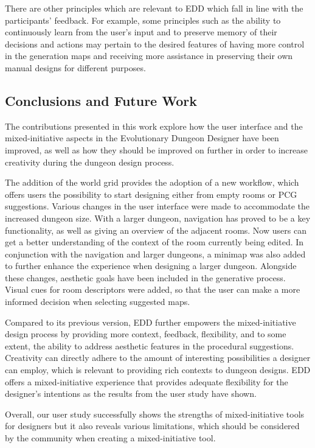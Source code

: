 There are other principles which are relevant to EDD which fall in line with the participants’ feedback. For example, some principles such as the ability to continuously learn from the user’s input and to preserve memory of their decisions and actions may pertain to the desired features of having more control in the generation maps and receiving more assistance in preserving their own manual designs for different purposes.

\subsection{Conclusions and Future Work}

The contributions presented in this work explore how the user interface and the mixed-initiative aspects in the Evolutionary Dungeon Designer have been improved, as well as how they should be improved on further in order to increase creativity during the dungeon design process.

The addition of the world grid provides the adoption of a new workflow, which offers users the possibility to start designing either from empty rooms or PCG suggestions. Various changes in the user interface were made to accommodate the increased dungeon size. With a larger dungeon, navigation has proved to be a key functionality, as well as giving an overview of the adjacent rooms. Now users can get a better understanding of the context of the room currently being edited. In conjunction with the navigation and larger dungeons, a minimap was also added to further enhance the experience when designing a larger dungeon. Alongside these changes, aesthetic goals have been included in the generative process. Visual cues for room descriptors were added, so that the user can make a more informed decision when selecting suggested maps.

Compared to its previous version, EDD further empowers the mixed-initiative design process by providing more context, feedback, flexibility, and to some extent, the ability to address aesthetic features in the procedural suggestions. Creativity can directly adhere to the amount of interesting possibilities a designer can employ, which is relevant to providing rich contexts to dungeon designs. EDD offers a mixed-initiative experience that provides adequate flexibility for the designer’s intentions as the results from the user study have shown.

Overall, our user study successfully shows the strengths of mixed-initiative tools for designers but it also reveals various limitations, which should be considered by the community when creating a mixed-initiative tool.

